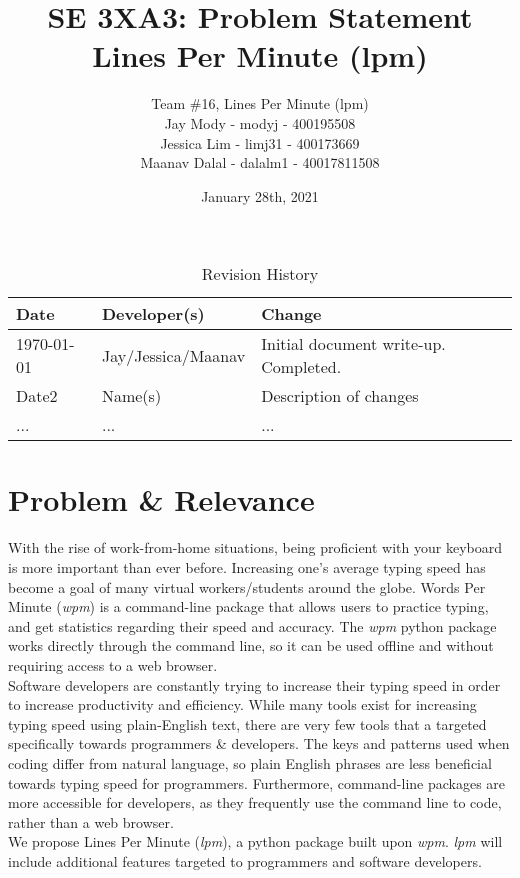 \documentclass{article}
\title{SE 3XA3: Problem Statement\\Lines Per Minute (lpm)}
\author{Team \#16, Lines Per Minute (lpm) \\
Jay Mody - modyj - 400195508\\
Jessica Lim - limj31 - 400173669\\
Maanav Dalal - dalalm1 - 40017811508\\
}
\date{January 28th, 2021}
\begin{document}
\maketitle

\begin{table}[hp]
\caption{Revision History} \label{TblRevisionHistory}
\begin{tabularx}{\textwidth}{llX}
\toprule
\textbf{Date} & \textbf{Developer(s)} & \textbf{Change}\\
\midrule
\today & Jay/Jessica/Maanav & Initial document write-up. Completed.\\
Date2 & Name(s) & Description of changes\\
... & ... & ...\\
\bottomrule
\end{tabularx}
\end{table}


\newpage

\section*{Problem \& Relevance}
With the rise of work-from-home situations, being proficient with your keyboard is more important than ever before. Increasing one's average typing speed has become a goal of many virtual workers/students around the globe. Words Per Minute (\textit{wpm}) is a command-line package that allows users to practice typing, and get statistics regarding their speed and accuracy. The \textit{wpm} python package works directly through the command line, so it can be used offline and without requiring access to a web browser. \\

Software developers are constantly trying to increase their typing speed in order to increase productivity and efficiency. While many tools exist for increasing typing speed using plain-English text, there are very few tools that a targeted specifically towards programmers \& developers. The keys and patterns used when coding differ from natural language, so plain English phrases are less beneficial towards typing speed for programmers. Furthermore, command-line packages are more accessible for developers, as they frequently use the command line to code, rather than a web browser. \\

We propose Lines Per Minute (\textit{lpm}), a python package built upon \textit{wpm}. \textit{lpm} will include additional features targeted to programmers and software developers. \\
\end{document}
